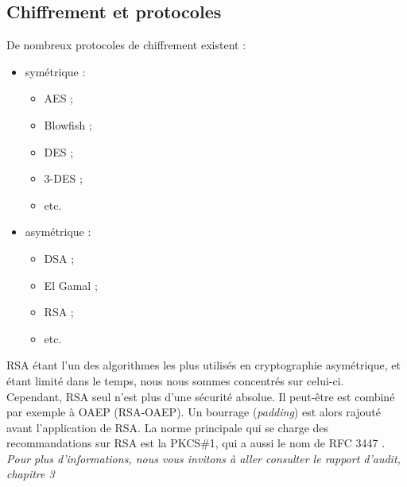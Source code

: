 \subsection{Chiffrement et protocoles}
De nombreux protocoles de chiffrement existent : 
\begin{itemize}
	\item symétrique :
	\begin {itemize}
		\item AES ;
		\item Blowfish ;
		\item DES ;
		\item 3-DES ;
		\item etc.\\
	\end{itemize}
	\item asymétrique : 
	\begin {itemize}
		\item DSA ;
		\item El Gamal ;
		\item RSA ;
		\item etc.\\
	\end{itemize}
\end{itemize}

RSA étant l'un des algorithmes les plus utilisés en cryptographie asymétrique, et étant limité dans le temps, nous nous sommes concentrés sur celui-ci.\\
Cependant, RSA seul n'est plus d'une sécurité absolue. Il peut-être est combiné par exemple à OAEP (RSA-OAEP). Un bourrage (\textit{padding}) est alors rajouté avant l'application de RSA. La norme principale qui se charge des recommandations sur RSA est la PKCS\#1, qui a aussi le nom de RFC 3447 \cite{3447} \cite{rfc3447_trad}.\\

\textit{Pour plus d'informations, nous vous invitons à aller consulter le rapport d'audit, chapitre 3} 

